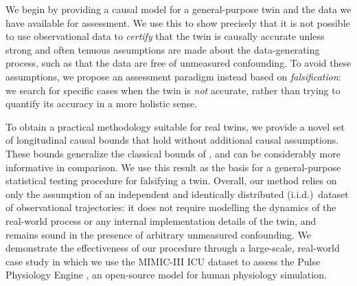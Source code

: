 We begin by providing a causal model for a general-purpose twin and the data we have available for assessment.
We use this to show precisely that it is not possible to use observational data to \emph{certify} that the twin is causally accurate unless strong and often tenuous assumptions are made about the data-generating process, such as that the data are free of unmeasured confounding.
To avoid these assumptions, we propose an assessment paradigm instead based on \emph{falsification}: we search for specific cases when the twin is \emph{not} accurate, rather than trying to quantify its accuracy in a more holistic sense. %

To obtain a practical methodology suitable for real twins, we provide a novel set of longitudinal causal bounds that hold without additional causal assumptions.
These bounds generalize the classical bounds of \cite{manski}, and can be considerably more informative in comparison.
We use this result as the basis for a general-purpose statistical testing procedure for falsifying a twin.
Overall, our method relies on only the assumption of an independent and identically distributed (i.i.d.)\ dataset of observational trajectories: it does not require modelling the dynamics of the real-world process or any internal implementation details of the twin, and remains sound in the presence of arbitrary unmeasured confounding. %
We demonstrate the effectiveness of our procedure through a large-scale, real-world case study in which we use the MIMIC-III ICU dataset \citep{mimic} to assess the Pulse Physiology Engine \citep{pulse}, an open-source model for human physiology simulation.

